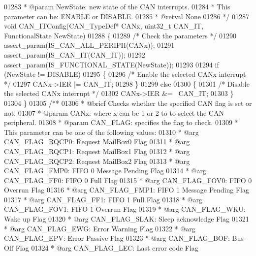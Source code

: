 \begin{DoxyCode}
01283 \textcolor{comment}{  * @param  NewState: new state of the CAN interrupts.}
01284 \textcolor{comment}{  *          This parameter can be: ENABLE or DISABLE.}
01285 \textcolor{comment}{  * @retval None}
01286 \textcolor{comment}{  */}
01287 \textcolor{keywordtype}{void} CAN_ITConfig(CAN\_TypeDef* CANx, uint32\_t CAN\_IT, FunctionalState NewState)
01288 \{
01289   \textcolor{comment}{/* Check the parameters */}
01290   assert_param(IS\_CAN\_ALL\_PERIPH(CANx));
01291   assert_param(IS\_CAN\_IT(CAN\_IT));
01292   assert_param(IS\_FUNCTIONAL\_STATE(NewState));
01293 
01294   \textcolor{keywordflow}{if} (NewState != DISABLE)
01295   \{
01296     \textcolor{comment}{/* Enable the selected CANx interrupt */}
01297     CANx->IER |= CAN\_IT;
01298   \}
01299   \textcolor{keywordflow}{else}
01300   \{
01301     \textcolor{comment}{/* Disable the selected CANx interrupt */}
01302     CANx->IER &= ~CAN\_IT;
01303   \}
01304 \}
01305 \textcolor{comment}{/**}
01306 \textcolor{comment}{  * @brief  Checks whether the specified CAN flag is set or not.}
01307 \textcolor{comment}{  * @param  CANx: where x can be 1 or 2 to to select the CAN peripheral.}
01308 \textcolor{comment}{  * @param  CAN\_FLAG: specifies the flag to check.}
01309 \textcolor{comment}{  *          This parameter can be one of the following values:}
01310 \textcolor{comment}{  *            @arg CAN\_FLAG\_RQCP0: Request MailBox0 Flag}
01311 \textcolor{comment}{  *            @arg CAN\_FLAG\_RQCP1: Request MailBox1 Flag}
01312 \textcolor{comment}{  *            @arg CAN\_FLAG\_RQCP2: Request MailBox2 Flag}
01313 \textcolor{comment}{  *            @arg CAN\_FLAG\_FMP0: FIFO 0 Message Pending Flag   }
01314 \textcolor{comment}{  *            @arg CAN\_FLAG\_FF0: FIFO 0 Full Flag       }
01315 \textcolor{comment}{  *            @arg CAN\_FLAG\_FOV0: FIFO 0 Overrun Flag }
01316 \textcolor{comment}{  *            @arg CAN\_FLAG\_FMP1: FIFO 1 Message Pending Flag   }
01317 \textcolor{comment}{  *            @arg CAN\_FLAG\_FF1: FIFO 1 Full Flag        }
01318 \textcolor{comment}{  *            @arg CAN\_FLAG\_FOV1: FIFO 1 Overrun Flag     }
01319 \textcolor{comment}{  *            @arg CAN\_FLAG\_WKU: Wake up Flag}
01320 \textcolor{comment}{  *            @arg CAN\_FLAG\_SLAK: Sleep acknowledge Flag }
01321 \textcolor{comment}{  *            @arg CAN\_FLAG\_EWG: Error Warning Flag}
01322 \textcolor{comment}{  *            @arg CAN\_FLAG\_EPV: Error Passive Flag  }
01323 \textcolor{comment}{  *            @arg CAN\_FLAG\_BOF: Bus-Off Flag    }
01324 \textcolor{comment}{  *            @arg CAN\_FLAG\_LEC: Last error code Flag      }

\end{DoxyCode}
